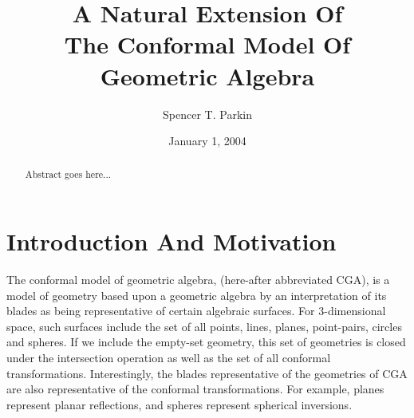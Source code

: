 \documentclass{birkjour}
\theoremstyle{definition}
\theoremstyle{remark}
\numberwithin{equation}{section}
\begin{document}
%
%
%
%
%
%
%
%

\title{A Natural Extension Of\\The Conformal Model Of\\Geometric Algebra}

\author{Spencer T. Parkin}





\date{January 1, 2004}


\begin{abstract}
Abstract goes here...
\end{abstract}

\maketitle

\section{Introduction And Motivation}

The conformal model of geometric algebra, (here-after abbreviated CGA), is
a model of geometry based upon a geometric algebra by an interpretation of its blades as being
representative of certain algebraic surfaces.  For 3-dimensional space, such surfaces include the set of all
points, lines, planes, point-pairs, circles and spheres.  If we include the empty-set geometry, this set
of geometries is closed under the intersection operation as well as the set of all conformal transformations.
Interestingly, the blades representative of the geometries of CGA are also
representative of the conformal transformations.  For example, planes represent planar reflections,
and spheres represent spherical inversions.
\end{document}
